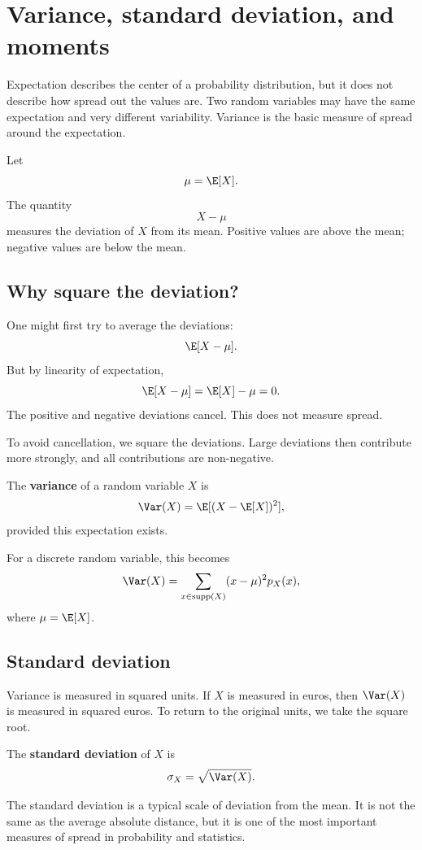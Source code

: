 \section{Variance, standard deviation, and moments}

Expectation describes the center of a probability distribution, but it does not
describe how spread out the values are. Two random variables may have the same
expectation and very different variability. Variance is the basic measure of
spread around the expectation.

Let
\[
\mu=\E[X].
\]
The quantity
\[
X-\mu
\]
measures the deviation of \(X\) from its mean. Positive values are above the
mean; negative values are below the mean.

\subsection*{Why square the deviation?}

One might first try to average the deviations:
\[
\E[X-\mu].
\]
But by linearity of expectation,
\[
\E[X-\mu]=\E[X]-\mu=0.
\]
The positive and negative deviations cancel. This does not measure spread.

To avoid cancellation, we square the deviations. Large deviations then contribute
more strongly, and all contributions are non-negative.

\begin{definitionbox}
The \textbf{variance} of a random variable \(X\) is
\[
\Var(X)=\E[(X-\E[X])^2],
\]
provided this expectation exists.
\end{definitionbox}

For a discrete random variable, this becomes
\[
\Var(X)=\sum_{x\in\operatorname{supp}(X)}(x-\mu)^2p_X(x),
\]
where \(\mu=\E[X]\).

\subsection*{Standard deviation}

Variance is measured in squared units. If \(X\) is measured in euros, then
\(\Var(X)\) is measured in squared euros. To return to the original units, we take
the square root.

\begin{definitionbox}
The \textbf{standard deviation} of \(X\) is
\[
\sigma_X=\sqrt{\Var(X)}.
\]
\end{definitionbox}

The standard deviation is a typical scale of deviation from the mean. It is not
the same as the average absolute distance, but it is one of the most important
measures of spread in probability and statistics.

